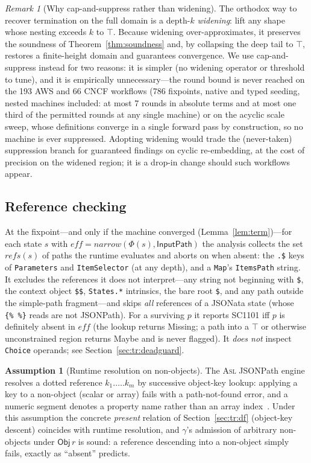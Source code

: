 \documentclass[11pt]{article}
\newcommand{\code}[1]{\textsf{\small #1}}
\newcommand{\asl}{\textsc{Asl}}
\newcommand{\Obj}{\mathsf{Obj}}
\newcommand{\narrow}{\mathit{narrow}}
\newcommand{\eff}{\mathit{eff}}
\theoremstyle{plain}
\theoremstyle{definition}
\newtheorem{assumption}{Assumption}
\theoremstyle{remark}
\newtheorem{remark}{Remark}
\begin{document}
\begin{remark}[Why cap-and-suppress rather than widening]
The orthodox way to recover termination on the full domain is a depth-$k$ \emph{widening}: lift any
shape whose nesting exceeds $k$ to $\top$. Because widening over-approximates, it preserves the
soundness of Theorem~\ref{thm:soundness} and, by collapsing the deep tail to $\top$, restores a
finite-height domain and guarantees convergence. We use cap-and-suppress instead for two reasons:
it is simpler (no widening operator or threshold to tune), and it is empirically unnecessary---the
round bound is never reached on the 193 AWS and 66 CNCF workflows (786 fixpoints, native and typed
seeding, nested machines included: at most 7 rounds in absolute terms and at most one third of the
permitted rounds at any single machine) or on the acyclic scale sweep, whose definitions converge
in a single forward pass by construction, so no machine is ever suppressed. Adopting widening would
trade the (never-taken) suppression branch for guaranteed findings on cyclic re-embedding, at the
cost of precision on the widened region; it is a drop-in change should such workflows appear.
\end{remark}

\subsection{Reference checking}

At the fixpoint---and only if the machine converged (Lemma~\ref{lem:term})---for each state $s$
with $\eff=\narrow(\Phi(s),\textsf{InputPath})$ the analysis collects the set $\mathit{refs}(s)$
of paths the runtime evaluates and aborts on when absent: the \texttt{.\$} keys of
\texttt{Parameters} and \texttt{ItemSelector} (at any depth), and a \texttt{Map}'s
\texttt{ItemsPath} string. It excludes the references it does not interpret---any string not
beginning with \texttt{\$}, the context object \texttt{\$\$}, \texttt{States.*} intrinsics, the
bare root \texttt{\$}, and any path outside the simple-path fragment---and skips \emph{all}
references of a JSONata state (whose \texttt{\{\%\ \%\}} reads are not JSONPath). For a surviving
$p$ it reports \code{SC1101} iff $p$ is definitely absent in $\eff$ (the lookup returns
\textsf{Missing}; a path into a $\top$ or otherwise unconstrained region returns \textsf{Maybe}
and is never flagged). It \emph{does not} inspect \texttt{Choice} operands; see
Section~\ref{sec:tr:deadguard}.

\begin{assumption}[Runtime resolution on non-objects]\label{asm:jsonpath}
The \asl{} JSONPath engine resolves a dotted reference $k_1.\dots.k_m$ by successive object-key
lookup: applying a key to a non-object (scalar or array) fails with a path-not-found error, and
a numeric segment denotes a property name rather than an array index~\cite{awsasl,jsonpath}.
Under this assumption the concrete \emph{present} relation of Section~\ref{sec:tr:df}
(object-key descent) coincides with runtime resolution, and $\gamma$'s admission of arbitrary
non-objects under $\Obj\,r$ is sound: a reference descending into a non-object simply fails,
exactly as ``absent'' predicts.
\end{assumption}
\end{document}
